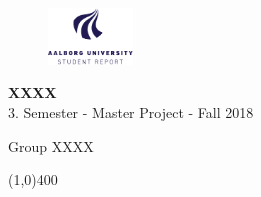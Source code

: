 \clearpage
\thispagestyle{empty}

\begin{figure}[H]
	\raggedleft
	\includegraphics[width=0.2\textwidth]{setup/aau_logo_en.pdf}
\end{figure} 

\vspace{5 cm}

\begin{center}	
	\begin{Huge}
		\textbf{XXXX}\\
		\vspace{5 mm}
		$3.$ Semester - Master Project -  Fall 2018\\
		\vspace{3 mm}
	\end{Huge}
	{\Large Group XXXX}
\end{center}
\vspace*{\fill}

\begin{center}
	\line(1,0){400}
\end{center}





